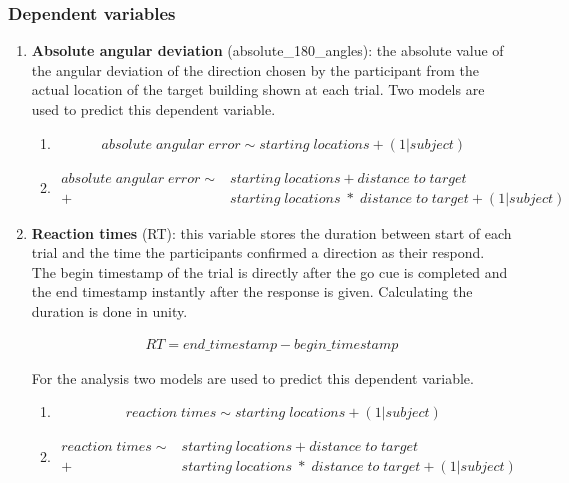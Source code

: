 \subsubsection{Dependent variables}

\begin{enumerate}
	\item \textbf{Absolute angular deviation} {\emphasize (absolute\_180\_angles)}: the absolute value of the angular deviation of the direction chosen by the participant from the actual location of the target building shown at each trial. Two models are used to predict this dependent variable. \\
	
	\begin{enumerate}
		\item
		\begin{align*}
			absolute \; angular \; error \sim starting \; locations + (1 | subject)
		\end{align*}
	
		\item 
		\begin{align*}
			absolute \; angular \; error \sim &starting \; locations + distance \; to \; target \\
			+ &starting \; locations \; * \; distance \; to \; target + (1 | subject)
		\end{align*}
	\end{enumerate}
	

	\item \textbf{Reaction times} {\emphasize (RT)}: this variable stores the duration between start of each trial and the time the participants confirmed a direction as their respond. The begin timestamp of the trial is directly after the go cue is completed and the end timestamp instantly after the response is given. Calculating the duration is done in unity. 
	
	\begin{align*}
		RT = end\_timestamp - begin\_timestamp
	\end{align*}

	 For the analysis two models are used to predict this dependent variable.\\
	 
	 
	 \begin{enumerate}
	 	\item
	 	\begin{align*}
	 		reaction \; times \sim starting \; locations + (1 | subject)
	 	\end{align*}
	 	
	 	\item 
	 	\begin{align*}
	 		reaction \; times \sim &starting \; locations + distance \; to \; target \\
	 		+ &starting \; locations \; * \; distance \; to \; target + (1 | subject)
	 	\end{align*}
	 \end{enumerate}
 
\end{enumerate}





